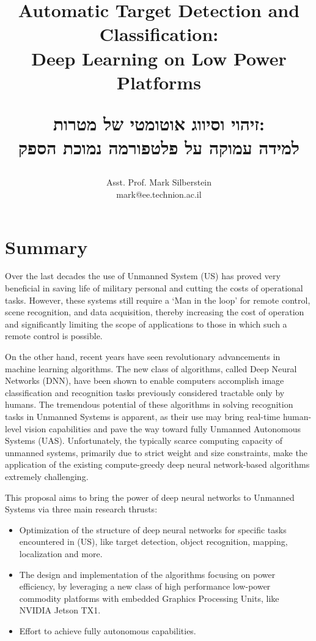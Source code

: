 \documentclass[a4paper]{article} %
\title{Automatic Target Detection and Classification: \\
  Deep Learning on Low Power Platforms \\
  \begin{otherlanguage}{hebrew}
    זיהוי וסיווג אוטומטי של מטרות: \\
    למידה עמוקה על פלטפורמה נמוכת הספק
  \end{otherlanguage}
}
\author{
  Asst. Prof. Mark Silberstein \\
  mark@ee.technion.ac.il\\
}
\begin{document}
\maketitle

\section{Summary}

Over the last decades the use of Unmanned System (US) has proved very beneficial
in saving life of military personal and cutting the costs of operational tasks.
However, these systems still require a `Man in the loop' for remote control,
scene recognition, and data acquisition, thereby increasing the cost of
operation and significantly limiting the scope of applications to those in which
such a remote control is possible.

On the other hand, recent years have seen revolutionary advancements in machine
learning algorithms. The new class of algorithms, called Deep Neural Networks
(DNN), have been shown to enable computers accomplish image classification and
recognition tasks previously considered tractable only by humans. The tremendous
potential of these algorithms in solving recognition tasks in Unmanned Systems
is apparent, as their use may bring real-time human-level vision capabilities
and pave the way toward fully Unmanned Autonomous Systems (UAS). Unfortunately,
the typically scarce computing capacity of unmanned systems, primarily due to
strict weight and size constraints, make the application of the existing
compute-greedy deep neural network-based algorithms extremely challenging.

This proposal aims to bring the power of deep neural networks to Unmanned
Systems via three main research thrusts:

\begin{itemize}
\item Optimization of the structure of deep neural networks for specific
	tasks encountered in (US), like target detection, object recognition,
	mapping, localization and more.
\item The design and implementation of the algorithms focusing on power
	efficiency, by leveraging a new  class of high
	performance low-power commodity platforms with embedded Graphics
	Processing Units, like  NVIDIA Jetson TX1.
\item Effort to achieve fully autonomous capabilities.
\end{itemize}
\end{document}
